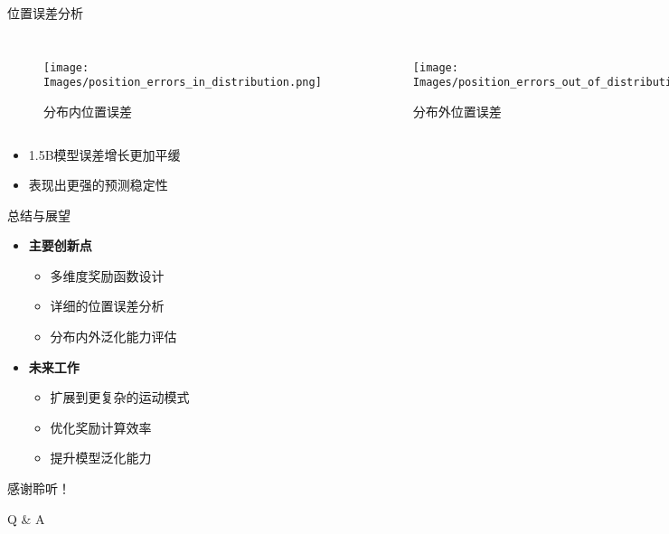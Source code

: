 \begin{frame}{位置误差分析}
    \begin{columns}
        \begin{figure}
            \texttt{[image: Images/position\_errors\_in\_distribution.png]}
            \caption{分布内位置误差}
        \end{figure}
        \begin{figure}
            \texttt{[image: Images/position\_errors\_out\_of\_distribution.png]}
            \caption{分布外位置误差}
        \end{figure}
    \end{columns}
    \begin{itemize}
        \item 1.5B模型误差增长更加平缓
        \item 表现出更强的预测稳定性
    \end{itemize}
\end{frame}

\begin{frame}{总结与展望}
    \begin{itemize}
        \item \textbf{主要创新点}
        \begin{itemize}
            \item 多维度奖励函数设计
            \item 详细的位置误差分析
            \item 分布内外泛化能力评估
        \end{itemize}
        \vspace{0.3cm}
        \item \textbf{未来工作}
        \begin{itemize}
            \item 扩展到更复杂的运动模式
            \item 优化奖励计算效率
            \item 提升模型泛化能力
        \end{itemize}
    \end{itemize}
\end{frame}

\begin{frame}
    \begin{center}
        \Huge 感谢聆听！
        \vspace{1cm}
        
        \Large Q \& A
    \end{center}
\end{frame}

